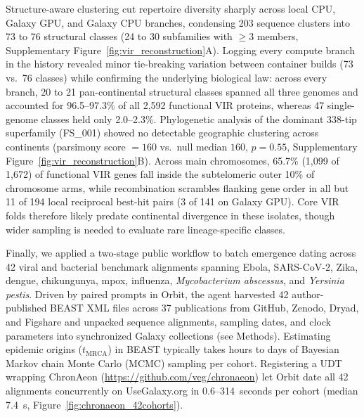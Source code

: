 \documentclass[11pt,letterpaper]{article}
\newcommand{\tool}[1]{\textsf{#1}}
\begin{document}
Structure-aware clustering cut repertoire diversity sharply across local CPU, Galaxy GPU, and Galaxy CPU branches, condensing 203 sequence clusters into 73 to 76 structural classes (24 to 30 subfamilies with $\ge 3$ members, Supplementary Figure~\ref{fig:vir_reconstruction}A). Logging every compute branch in the history revealed minor tie-breaking variation between container builds (73 vs.\ 76 classes) while confirming the underlying biological law: across every branch, 20 to 21 pan-continental structural classes spanned all three genomes and accounted for 96.5--97.3\% of all 2,592 functional VIR proteins, whereas 47 single-genome classes held only 2.0--2.3\%. Phylogenetic analysis of the dominant 338-tip superfamily (FS\_001) showed no detectable geographic clustering across continents (parsimony score $= 160$ vs.\ null median $160$, $p = 0.55$, Supplementary Figure~\ref{fig:vir_reconstruction}B). Across main chromosomes, 65.7\% (1,099 of 1,672) of functional VIR genes fall inside the subtelomeric outer 10\% of chromosome arms, while recombination scrambles flanking gene order in all but 11 of 194 local reciprocal best-hit pairs (3 of 141 on Galaxy GPU). Core VIR folds therefore likely predate continental divergence in these isolates, though wider sampling is needed to evaluate rare lineage-specific classes.

Finally, we applied a two-stage public workflow to batch emergence dating across 42 viral and bacterial benchmark alignments spanning Ebola, SARS-CoV-2, Zika, dengue, chikungunya, mpox, influenza, \textit{Mycobacterium abscessus}, and \textit{Yersinia pestis}. Driven by paired prompts in \tool{Orbit}, the agent harvested 42 author-published \tool{BEAST} XML files across 37 publications from GitHub, Zenodo, Dryad, and Figshare and unpacked sequence alignments, sampling dates, and clock parameters into synchronized Galaxy collections (see Methods). Estimating epidemic origins ($t_{\mathrm{MRCA}}$) in \tool{BEAST} \cite{suchard2018} typically takes hours to days of Bayesian Markov chain Monte Carlo (MCMC) sampling per cohort. Registering a UDT wrapping \tool{ChronAeon} (\url{https://github.com/veg/chronaeon}) \cite{pond2026hyphaeon} let \tool{Orbit} date all 42 alignments concurrently on UseGalaxy.org in 0.6--314~seconds per cohort (median 7.4~s, Figure~\ref{fig:chronaeon_42cohorts}).
\end{document}

